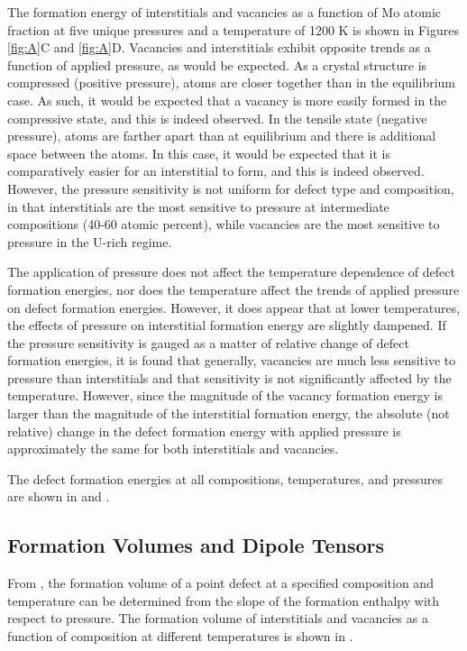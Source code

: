 \documentclass[review]{elsarticle}
\begin{document}
The formation energy of interstitials and vacancies as a function of Mo atomic fraction at five unique pressures and a temperature of 1200 K is shown in Figures \ref{fig:A}C and \ref{fig:A}D. Vacancies and interstitials exhibit opposite trends as a function of applied pressure, as would be expected. As a crystal structure is compressed (positive pressure), atoms are closer together than in the equilibrium case. As such, it would be expected that a vacancy is more easily formed in the compressive state, and this is indeed observed. In the tensile state (negative pressure), atoms are farther apart than at equilibrium and there is additional space between the atoms. In this case, it would be expected that it is comparatively easier for an interstitial to form, and this is indeed observed. However, the pressure sensitivity is not uniform for defect type and composition, in that interstitials are the most sensitive to pressure at intermediate compositions (40-60 atomic percent), while vacancies are the most sensitive to pressure in the U-rich regime. 

The application of pressure does not affect the temperature dependence of defect formation energies, nor does the temperature affect the trends of applied pressure on defect formation energies. However, it does appear that at lower temperatures, the effects of pressure on interstitial formation energy are slightly dampened. If the pressure sensitivity is gauged as a matter of relative change of defect formation energies, it is found that generally, vacancies are much less sensitive to pressure than interstitials and that sensitivity is not significantly affected by the temperature. However, since the magnitude of the vacancy formation energy is larger than the magnitude of the interstitial formation energy, the absolute (not relative) change in the defect formation energy with applied pressure is approximately the same for both interstitials and vacancies. 

The defect formation energies at all compositions, temperatures, and pressures are shown in  and . 

\subsection{Formation Volumes and Dipole Tensors}

From , the formation volume of a point defect at a specified composition and temperature can be determined from the slope of the formation enthalpy with respect to pressure. The formation volume of interstitials and vacancies as a function of composition at different temperatures is shown in .
\end{document}
